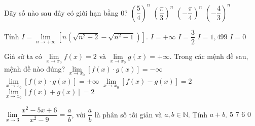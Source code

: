 \begin{ex}%
Dãy số nào sau đây có giới hạn bằng $0$?
\choice
{$\left(\dfrac{5}{4}\right)^n$}
{$\left(\dfrac{\pi}{3}\right)^n$}
{\True $\left(-\dfrac{\pi}{4}\right)^n$}
{$\left(-\dfrac{4}{3}\right)^n$}
\end{ex}

\begin{ex}%
Tính $I=\lim\limits_{n \to +\infty}\left[n\left(\sqrt{n^2+2}-\sqrt{n^2-1} \right)\right]$.
\choice
{$I=+\infty$}
{\True $I=\dfrac{3}{2}$}
{$I=1{,}499$}
{$I=0$}
\end{ex}

\begin{ex}%
Giả sử ta có $\lim\limits_{x\to x_0} f(x)=2$ và $\lim\limits_{x\to x_0} g(x)=+\infty$. Trong các mệnh đề sau, mệnh đề nào đúng?
\choice
{$\lim\limits_{x\to x_0}[f(x) \cdot g(x)]=-\infty$}
{\True $\lim\limits_{x\to x_0}[f(x) \cdot g(x)]=+\infty$}
{$\lim\limits_{x\to x_0}[f(x)-g(x)]=2$}
{$\lim\limits_{x\to x_0}[f(x)+g(x)]=2$}
\end{ex}

\begin{ex}%
$\lim\limits_{x \to 3} \dfrac{x^2-5x+6}{x^2-9}=\dfrac{a}{b}$, với $\dfrac{a}{b}$ là phân số tối giản và $a, b \in \mathbb{N}$. Tính $a+b$.
\choice
{$5$}
{\True $7$}
{$6$}
{$0$}
\end{ex}

